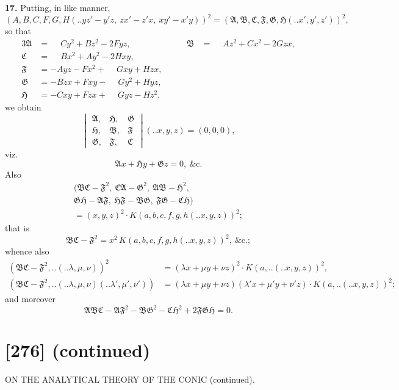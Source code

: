 \documentclass[12pt,a4paper]{article}
\newcommand{\mfA}{\mathfrak{A}}
\newcommand{\mfB}{\mathfrak{B}}
\newcommand{\mfC}{\mathfrak{C}}
\newcommand{\mfF}{\mathfrak{F}}
\newcommand{\mfG}{\mathfrak{G}}
\newcommand{\mfH}{\mathfrak{H}}
\newcommand{\qform}[2]{(#1 \mathbin{..} #2)}
\theoremstyle{definition}
\begin{document}
\textbf{17.} Putting, in like manner,
\[
(A, B, C, F, G, H \!\qform{}{yz' - y'z,\ zx' - z'x,\ xy' - x'y})^{2}
= (\mfA, \mfB, \mfC, \mfF, \mfG, \mfH \!\qform{}{x', y', z'})^{2},
\]
so that
\begin{alignat*}{3}
\mfA &= \phantom{-}Cy^{2} + Bz^{2} - 2Fyz, &\qquad
\mfB &= \phantom{-}Az^{2} + Cx^{2} - 2Gzx, \\
\mfC &= \phantom{-}Bx^{2} + Ay^{2} - 2Hxy, \\
\mfF &= -Ayz - Fx^{2} + \phantom{-}Gxy + Hzx, \\
\mfG &= -Bzx + Fxy - \phantom{-}Gy^{2} + Hyz, \\
\mfH &= -Cxy + Fzx + \phantom{-}Gyz - Hz^{2},
\end{alignat*}
we obtain
\[
\begin{vmatrix}
\mfA, & \mfH, & \mfG \\
\mfH, & \mfB, & \mfF \\
\mfG, & \mfF, & \mfC
\end{vmatrix}
\!\qform{}{x, y, z} = (0, 0, 0),
\]
viz.
\[
\mfA x + \mfH y + \mfG z = 0,\ \&\mathrm{c}.
\]
Also
\begin{multline*}
(\mfB\mfC - \mfF^{2},\ \mfC\mfA - \mfG^{2},\ \mfA\mfB - \mfH^{2},\ \\
\mfG\mfH - \mfA\mfF,\ \mfH\mfF - \mfB\mfG,\ \mfF\mfG - \mfC\mfH) \\
= (x, y, z)^{2} \cdot K(a, b, c, f, g, h \!\qform{}{x, y, z})^{2};
\end{multline*}
that is
\[
\mfB\mfC - \mfF^{2} = x^{2}\, K(a, b, c, f, g, h \!\qform{}{x, y, z})^{2},\ \&\mathrm{c}.;
\]
whence also
\begin{align*}
(\mfB\mfC - \mfF^{2},..\!\qform{}{\lambda, \mu, \nu})^{2}
&= (\lambda x + \mu y + \nu z)^{2} \cdot K(a,..\!\qform{}{x, y, z})^{2},\\
(\mfB\mfC - \mfF^{2},..\!\qform{}{\lambda, \mu, \nu}\!\qform{}{\lambda', \mu', \nu'})
&= (\lambda x + \mu y + \nu z)(\lambda' x + \mu' y + \nu' z) \cdot K(a,..\!\qform{}{x, y, z})^{2};
\end{align*}
and moreover
\[
\mfA\mfB\mfC - \mfA\mfF^{2} - \mfB\mfG^{2} - \mfC\mfH^{2} + 2\mfF\mfG\mfH = 0.
\]

\newpage
\section*{[276] (continued)}
\begin{center}
{\large ON THE ANALYTICAL THEORY OF THE CONIC (continued).}
\end{center}
\end{document}
